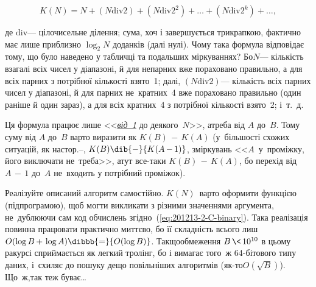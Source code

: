 \begin{equation}
K(N) = N + (N\mathbin{\mathrm{div}}2) + (N\mathbin{\mathrm{div}}2^2) + \ldots + (N\mathbin{\mathrm{div}}2^k) + \ldots,
\label{eq:201213-2-C-binary}
\end{equation}

\ifBigStretch
\vspace{-0.75\baselineskip}
\fi

\noindent
де $\mathbin{\mathrm{div}}$\nolinebreak[3] --- цілочисельне ділення; сума, хоч і завершується трикрапкою, фактично має лише приблизно $\log_2{N}$ доданків (далі нулі). Чому така формула відповідає тому, що було наведено у табличці та подальших міркуваннях? Бо\nolinebreak[2] $N$\nolinebreak[3] --- кількість взагалі всіх чисел у діапазоні, й для непарних вже пораховано правильно, а для всіх парних з потрібної кількості взято~1; далі, ${(N\mathbin{\mathrm{div}}2)}$\nolinebreak[3] --- кількість всіх парних чисел у діапазоні, й для парних не~кратних~4 вже пораховано правильно (один раніше й один зараз), а для всіх кратних~4 з потрібної кількості взято~2; і~т.~д.

Ця формула працює лише <<\underline{\emph{від~1}} до деякого~$N$>>, а\nolinebreak[3] треба від $A$ до~$B$. 
Тому суму від $A$ до~$B$ варто виразити  
як ${K(B)\,{-}\,K(A)}$ (у~більшості схожих ситуацій, як на\nolinebreak[2] стор.\nolinebreak[3] \mbox{\pageref{text:num-divisors-in-range-best-algo-begin}--\pageref{text:num-divisors-in-range-best-algo-end}}, ${K(B)}\dib{{-}}{K(A\,{-}\,1)}$, з\nolinebreak[3] міркувань <<$A$~у~проміжку, його виключати не~треба>>, а\nolinebreak[3] тут все-таки ${K(B)\,{-}\,K(A)}$, бо перехід від ${A\,{-}\,1}$ до~$A$ не~входить у потрібний проміжок).\label{text:201213-2-C-about-range-subtract}

Реалізуйте описаний алгоритм самостійно. 
$K(N)$~варто оформити функцією (підпрограмою), щоб могти викликати з різними значеннями аргумента, не~дублюючи сам код обчислень згідно~(\ref{eq:201213-2-C-binary}).
Така реалізація повинна працювати практично миттєво, бо її складність всього лиш ${O(\log{B}\,{+}\,\log{A})}\dibbb{{=}}{O(\log{B})}$.
Так\nolinebreak[3] що\nolinebreak[2] обмеження ${B\,{\<}\,10^{10}}$ в цьому ракурсі сприймається як легкий тролінг, бо і вимагає того~ж \mbox{64-}\nolinebreak[3]біто\-вого типу даних, і~схиляє до пошуку дещо повільніших алгоритмів (\mbox{як-то}\nolinebreak[3] $O(\sqrt{B})$). Що~ж,\nolinebreak[2] так теж буває\dots